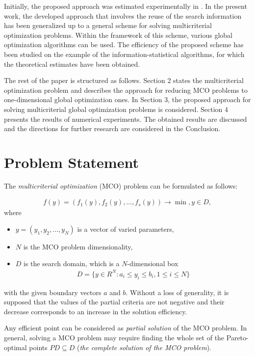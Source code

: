 \documentclass[smallcondensed]{svjour3}     %
\begin{document}
Initially, the proposed approach was estimated experimentally in \cite{c47}. In the present work, the developed approach that involves the reuse of the search information has been generalized up to a general scheme for solving multicriterial optimization problems. Within the framework of this scheme, various global optimization algorithms can be used. The efficiency of the proposed scheme has been studied on the example of the information-statistical algorithms, for which the theoretical estimates have been obtained. \par

The rest of the paper is structured as follows. Section 2 states the multicriterial optimization problem and describes the approach for reducing MCO problems to one-dimensional global optimization ones. In Section 3, the proposed approach for solving multicriterial global optimization problems is considered. Section 4 presents the results of numerical experiments. The obtained results are discussed and the directions for further research are considered in the Conclusion.

\section{Problem Statement}  \label{sec:2}
The {\it multicriterial optimization} (MCO) problem can be formulated as follows:

\begin{eqnarray} \label{eq:01}
f(y) = (f_1(y), f_2(y),\dots, f_s(y)) \to \min,  y \in D,
\end{eqnarray}
where
\begin{itemize}
\item	$y = (y_1, y_2, \dots , y_N)$ is a vector of varied parameters,
\item	$N$ is the MCO problem dimensionality,
\item	$D$ is the search domain, which is a $N$-dimensional box
\begin{eqnarray*}
D  = \{ y \in R^N: a_i \leq y_i \leq b_i, 1 \leq i \leq N \}
\end{eqnarray*}
\end{itemize}
with the given boundary vectors $a$ and $b$. Without a loss of generality, it is supposed that the values of the partial criteria are not negative and their decrease corresponds to an increase in the solution efficiency. \par

Any efficient point can be considered as {\it partial solution} of the MCO problem. In general, solving a MCO problem may require finding the whole set of the Pareto-optimal points $PD \subseteq D$ ({\it the complete solution of the MCO problem}). \par
\end{document}
